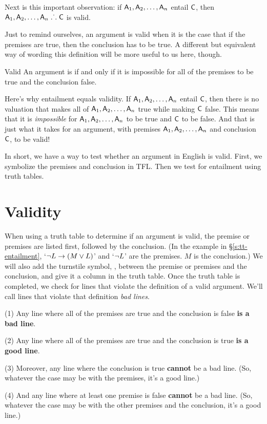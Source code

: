 Next is this important observation: if $\mathsf{A}_1, \mathsf{A}_2, \ldots, \mathsf{A}_n$ entail $\mathsf{C}$, then $\mathsf{A}_1, \mathsf{A}_2, \ldots, \mathsf{A}_n \mathrel{\ldotp\dot{}\,\ldotp} \mathsf{C}$ is valid.

Just to remind ourselves, an argument is valid when it is the case that if the premises are true, then the conclusion has to be true. A different but equivalent way of wording this definition will be more useful to us here, though. 
\begin{factboxy}{Valid}
An argument is  if and only if it is impossible for all of the premises to be true and the conclusion false.
\end{factboxy}

Here's why entailment equals validity. If $\mathsf{A}_1, \mathsf{A}_2, \ldots, \mathsf{A}_n$ entail $\mathsf{C}$, then there is no valuation that makes all of $\mathsf{A}_1, \mathsf{A}_2, \ldots, \mathsf{A}_n$ true while making $\mathsf{C}$ false. This means that it is \emph{impossible} for $\mathsf{A}_1, \mathsf{A}_2, \ldots, \mathsf{A}_n$ to be true and $\mathsf{C}$ to be false. And that is just what it takes for an argument, with premises $\mathsf{A}_1, \mathsf{A}_2, \ldots, \mathsf{A}_n$ and conclusion $\mathsf{C}$, to be valid!

In short, we have a way to test whether an argument in English is valid. First, we symbolize the premises and conclusion in TFL. Then we test for entailment using truth tables. 

\section{Validity}\label{s:tt-validity}

When using a truth table to determine if an argument is valid, the premise or premises are listed first, followed by the conclusion. (In the example in \S\ref{s:tt-entailment}, `${\neg} L \rightarrow (M \vee L)$' and `${\neg} L$' are the premises. $M$ is the conclusion.) We will also add the turnstile symbol, \proves, between the premise or premises and the conclusion, and give it a column in the truth table. Once the truth table is completed, we check for lines that violate the definition of a valid argument. We'll call lines that violate that definition \textit{bad lines}. 
	\begin{earg}
		\item[(1)] Any line where all of the premises are true and the conclusion is false \textbf{is a bad line}.
		\item[(2)] Any line where all of the premises are true and the conclusion is true \textbf{is a good line}.
		\item[(3)] Moreover, any line where the conclusion is true \textbf{cannot} be a bad line. (So, whatever the case may be with the premises, it's a good line.) 
		\item[(4)] And any line where at least one premise is false \textbf{cannot} be a bad line. (So, whatever the case may be with the other premises and the 			 								conclusion, it's a good line.) 
	\end{earg}

